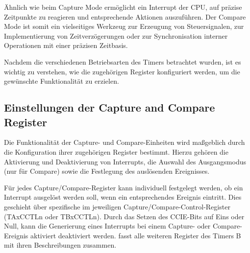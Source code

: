 \"Ahnlich wie beim Capture Mode erm\"oglicht ein Interrupt der CPU, auf pr\"azise Zeitpunkte zu reagieren und entsprechende Aktionen auszuf\"uhren. Der Compare Mode ist somit ein vielseitiges Werkzeug zur Erzeugung von Steuersignalen, zur Implementierung von Zeitverz\"ogerungen oder zur Synchronisation interner Operationen mit einer pr\"azisen Zeitbasis. 

Nachdem die verschiedenen Betriebsarten des Timers betrachtet wurden, ist es wichtig zu verstehen, wie die zugeh\"origen Register konfiguriert werden, um die gew\"unschte Funktionalit\"at zu erzielen.


\subsection{Einstellungen der Capture and Compare Register}
\label{sec:CC_Register}

Die Funktionalit\"at der Capture- und Compare-Einheiten wird ma{\ss}geblich durch die Konfiguration ihrer zugeh\"origen Register bestimmt. Hierzu geh\"oren die Aktivierung und Deaktivierung von Interrupts, die Auswahl des Ausgangsmodus (nur f\"ur Compare) sowie die Festlegung des ausl\"osenden Ereignisses.

F\"ur jedes Capture/Compare-Register kann individuell festgelegt werden, ob ein Interrupt ausgel\"ost werden soll, wenn ein entsprechendes Ereignis eintritt. Dies geschieht \"uber spezifische  im jeweiligen Capture/Compare-Control-Register (TAxCCTLn oder TBxCCTLn). Durch das Setzen des CCIE-Bits auf Eins oder Null, kann die Generierung eines Interrupts bei einem Capture- oder Compare-Ereignis aktiviert \bzw deaktiviert werden.  fasst alle weiteren Register des Timers B mit ihren Beschreibungen zusammen.


